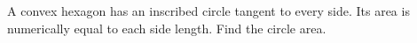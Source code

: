 A convex hexagon has an inscribed circle tangent to every side. Its area is numerically equal to each side length. Find the circle area.
